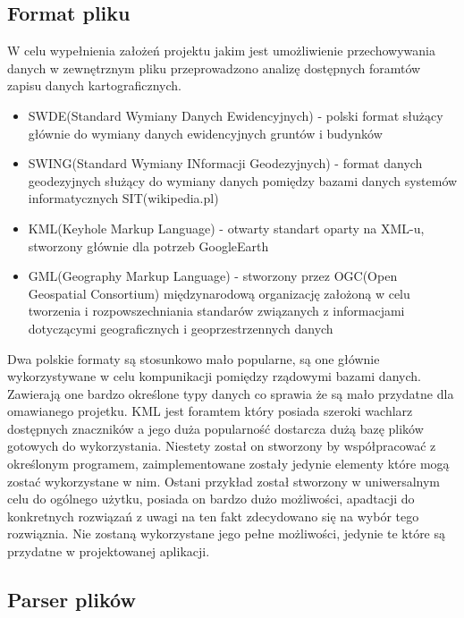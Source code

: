 \subsection{Format pliku}
\label{subsec:fileformat}

W celu wypełnienia założeń projektu jakim jest umożliwienie przechowywania danych w zewnętrznym pliku przeprowadzono analizę dostępnych foramtów zapisu danych kartograficznych.

\begin{itemize}

\item
SWDE(Standard Wymiany Danych Ewidencyjnych) - polski format służący głównie do wymiany danych ewidencyjnych gruntów i budynków

\item
SWING(Standard Wymiany INformacji Geodezyjnych) - format danych geodezyjnych służący do wymiany danych pomiędzy bazami danych systemów informatycznych SIT(wikipedia.pl)

\item
KML(Keyhole Markup Language) - otwarty standart oparty na XML-u, stworzony głównie dla potrzeb GoogleEarth

\item
GML(Geography Markup Language) - stworzony przez OGC(Open Geospatial Consortium) międzynarodową organizację założoną w celu tworzenia i rozpowszechniania standarów związanych z informacjami dotyczącymi geograficznych i geoprzestrzennych danych

\end{itemize}

Dwa polskie formaty są stosunkowo mało popularne, są one głównie wykorzystywane w celu kompunikacji pomiędzy rządowymi bazami danych. Zawierają one bardzo określone typy danych co sprawia że są mało przydatne dla omawianego projetku. KML jest foramtem który posiada szeroki wachlarz dostępnych znaczników a jego duża popularność dostarcza dużą bazę plików gotowych do wykorzystania. Niestety został on stworzony by współpracować z określonym programem, zaimplementowane zostały jedynie elementy które mogą zostać wykorzystane w nim. Ostani przykład został stworzony w uniwersalnym celu do ogólnego użytku, posiada on bardzo dużo możliwości, apadtacji do konkretnych rozwiązań\cite{gml} z uwagi na ten fakt zdecydowano się na wybór tego rozwiąznia. Nie zostaną wykorzystane jego pełne możliwości, jedynie te które są przydatne w projektowanej aplikacji.


\subsection{Parser plików}
\label{subsec:parser}


